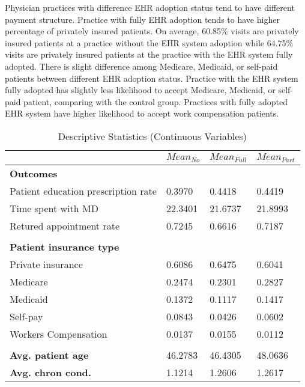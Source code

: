 \documentclass[12pt]{report}
\begin{document}
Physician practices with difference EHR adoption status tend to have different payment structure. Practice with fully EHR adoption tends to have higher percentage of privately insured patients. On average, 60.85\% visits are privately insured patients at a practice without the EHR system adoption while 64.75\% visits are privately insured patients at the practice with the EHR system fully adopted. There is slight difference among Medicare, Medicaid, or self-paid patients between different EHR adoption status. Practice with the EHR system fully adopted has slightly less likelihood to accept Medicare, Medicaid, or self-paid patient, comparing with the control group. Practices with fully adopted EHR system have higher likelihood to accept work compensation patients.

\begin{table}[h]
\footnotesize 
\centering
\caption{Descriptive Statistics (Continuous Variables)}

\label{tab:desc2}

\begin{tabular}{@{}llll@{}}
\toprule \toprule
                                    & $Mean_{No}$ & $Mean_{Full}$ & $Mean_{Part}$ \\ \midrule
\textbf{Outcomes}                   &           &             &             \\
Patient education prescription rate & 0.3970    & 0.4418      & 0.4419      \\
Time spent with MD                  & 22.3401   & 21.6737     & 21.8993     \\
Retured appointment rate            & 0.7245    & 0.6616      & 0.7187      \\
                                    &           &             &             \\
\textbf{Patient insurance type}     &           &             &             \\
Private insurance                   & 0.6086    & 0.6475      & 0.6041      \\
Medicare                            & 0.2474    & 0.2301      & 0.2827      \\
Medicaid                            & 0.1372    & 0.1117      & 0.1417      \\
Self-pay                            & 0.0843    & 0.0426      & 0.0602      \\
Workers Compensation                & 0.0137    & 0.0155      & 0.0112      \\
                                    &           &             &             \\
\textbf{Avg. patient age}           & 46.2783   & 46.4305     & 48.0636     \\
\textbf{Avg. chron cond.}           & 1.1214    & 1.2606      & 1.2617      \\ \bottomrule
\end{tabular}
\end{table}
\end{document}
